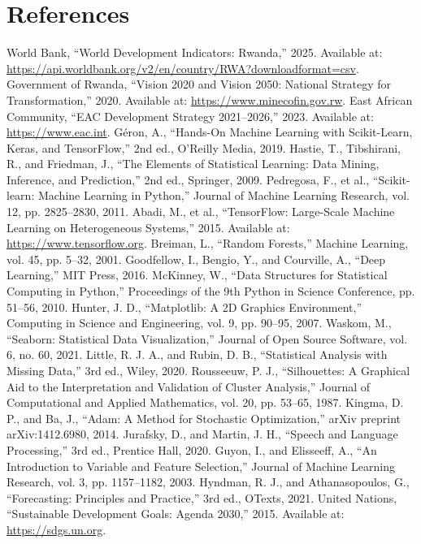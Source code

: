 \documentclass[12pt]{article}
\begin{document}
	\section{References}
	
	\begin{thebibliography}{9}
		World Bank, ``World Development Indicators: Rwanda,'' 2025. Available at: \url{https://api.worldbank.org/v2/en/country/RWA?downloadformat=csv}.
		Government of Rwanda, ``Vision 2020 and Vision 2050: National Strategy for Transformation,'' 2020. Available at: \url{https://www.minecofin.gov.rw}.
		East African Community, ``EAC Development Strategy 2021–2026,'' 2023. Available at: \url{https://www.eac.int}.
		Géron, A., ``Hands-On Machine Learning with Scikit-Learn, Keras, and TensorFlow,'' 2nd ed., O'Reilly Media, 2019.
		Hastie, T., Tibshirani, R., and Friedman, J., ``The Elements of Statistical Learning: Data Mining, Inference, and Prediction,'' 2nd ed., Springer, 2009.
		Pedregosa, F., et al., ``Scikit-learn: Machine Learning in Python,'' Journal of Machine Learning Research, vol. 12, pp. 2825–2830, 2011.
		Abadi, M., et al., ``TensorFlow: Large-Scale Machine Learning on Heterogeneous Systems,'' 2015. Available at: \url{https://www.tensorflow.org}.
		Breiman, L., ``Random Forests,'' Machine Learning, vol. 45, pp. 5–32, 2001.
		Goodfellow, I., Bengio, Y., and Courville, A., ``Deep Learning,'' MIT Press, 2016.
		McKinney, W., ``Data Structures for Statistical Computing in Python,'' Proceedings of the 9th Python in Science Conference, pp. 51–56, 2010.
		Hunter, J. D., ``Matplotlib: A 2D Graphics Environment,'' Computing in Science and Engineering, vol. 9, pp. 90–95, 2007.
		Waskom, M., ``Seaborn: Statistical Data Visualization,'' Journal of Open Source Software, vol. 6, no. 60, 2021.
		Little, R. J. A., and Rubin, D. B., ``Statistical Analysis with Missing Data,'' 3rd ed., Wiley, 2020.
		Rousseeuw, P. J., ``Silhouettes: A Graphical Aid to the Interpretation and Validation of Cluster Analysis,'' Journal of Computational and Applied Mathematics, vol. 20, pp. 53–65, 1987.
		Kingma, D. P., and Ba, J., ``Adam: A Method for Stochastic Optimization,'' arXiv preprint arXiv:1412.6980, 2014.
		Jurafsky, D., and Martin, J. H., ``Speech and Language Processing,'' 3rd ed., Prentice Hall, 2020.
		Guyon, I., and Elisseeff, A., ``An Introduction to Variable and Feature Selection,'' Journal of Machine Learning Research, vol. 3, pp. 1157–1182, 2003.
		Hyndman, R. J., and Athanasopoulos, G., ``Forecasting: Principles and Practice,'' 3rd ed., OTexts, 2021.
		United Nations, ``Sustainable Development Goals: Agenda 2030,'' 2015. Available at: \url{https://sdgs.un.org}.
	\end{thebibliography}
	
\end{document}
